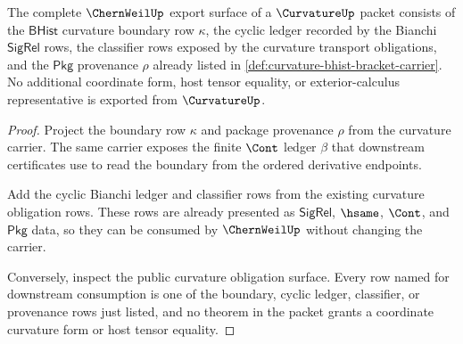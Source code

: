 \begin{theorem}
\label{thm:curvature-chernweil-export-dependency-row}
The complete $\ChernWeilUp$ export surface of a $\CurvatureUp$ packet consists of the $\mathsf{BHist}$ curvature boundary row $\kappa$, the cyclic ledger recorded by the Bianchi $\mathsf{SigRel}$ rows, the classifier rows exposed by the curvature transport obligations, and the $\mathsf{Pkg}$ provenance $\rho$ already listed in \autoref{def:curvature-bhist-bracket-carrier}. No additional coordinate form, host tensor equality, or exterior-calculus representative is exported from $\CurvatureUp$.
\end{theorem}
\begin{proof}
Project the boundary row $\kappa$ and package provenance $\rho$ from the curvature carrier. The same carrier exposes the finite $\Cont$ ledger $\beta$ that downstream certificates use to read the boundary from the ordered derivative endpoints.

Add the cyclic Bianchi ledger and classifier rows from the existing curvature obligation rows. These rows are already presented as $\mathsf{SigRel}$, $\hsame$, $\Cont$, and $\mathsf{Pkg}$ data, so they can be consumed by $\ChernWeilUp$ without changing the carrier.

Conversely, inspect the public curvature obligation surface. Every row named for downstream consumption is one of the boundary, cyclic ledger, classifier, or provenance rows just listed, and no theorem in the packet grants a coordinate curvature form or host tensor equality.
\end{proof}

